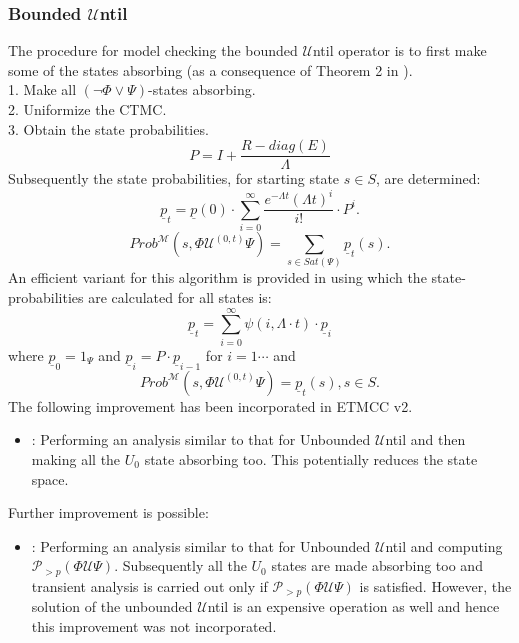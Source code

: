 \documentclass[a4paper,10pt]{article}
\begin{document}
	\subsubsection{Bounded $\mathcal{U}$ntil}
	The procedure for model checking the bounded $\mathcal{U}$ntil operator is to first make some of the states absorbing (as a consequence of Theorem 2 in \cite{baier1}). \\
	1. Make all $(\lnot\Phi\vee\Psi)$-states absorbing. \\
	2. Uniformize the CTMC. \\
	3. Obtain the state probabilities.
	\begin{equation*}
	P=I+\frac{R-diag(E)}{\Lambda}
	\end{equation*} 
	Subsequently the state probabilities, for starting state $s\in S$, are determined:
	\begin{equation*}
	\underline{p}_{t}=\underline{p}(0)\cdot\sum\limits_{i=0}^{\infty }\frac{e^{-\Lambda t}(\Lambda t)^{i}}{i!}\cdot P^{i}.
	\end{equation*}
	\begin{equation*}
	Prob^{\mathcal{M}}(s,\Phi\mathcal{U}^{(0,t)}\Psi)=\sum\limits_{s\in Sat(\Psi)}\underline{p}_{t}(s).
	\end{equation*}
	An efficient variant for this algorithm is provided in \cite{katoen1} using which the state-probabilities are calculated for all states is:
	\begin{equation*}	
	\underline{p}_{t}=\sum\limits_{i=0}^{\infty }\psi(i, \Lambda\cdot t)\cdot \underline{p}_{i}
	\end{equation*}
	where $\underline{p}_{0} = 1_{\Psi}$ and $\underline{p}_{i}=P\cdot\underline{p}_{i-1}$ for $i=1\cdots$ and
	\begin{equation*}
	Prob^{\mathcal{M}}(s,\Phi\mathcal{U}^{(0,t)}\Psi)=\underline{p}_{t}(s), s\in S.
	\end{equation*}
	The following improvement has been incorporated in ETMCC v2.
	\begin{itemize}
		\item: Performing an analysis similar to that for Unbounded $\mathcal{U}$ntil and then making all the $U_{0}$ state absorbing too. This potentially reduces the state space.
	\end{itemize}
	Further improvement is possible:
	\begin{itemize}
		\item: Performing an analysis similar to that for Unbounded $\mathcal{U}$ntil and computing $\mathcal{P}_{>p}(\Phi \mathcal{U} \Psi)$. Subsequently all the $U_{0}$ states are made absorbing too and transient analysis is carried out only if $\mathcal{P}_{>p}(\Phi \mathcal{U} \Psi)$ is satisfied. However, the solution of the unbounded $\mathcal{U}$ntil is an expensive operation as well and hence this improvement was not incorporated. 
	\end{itemize}
	
\end{document}
